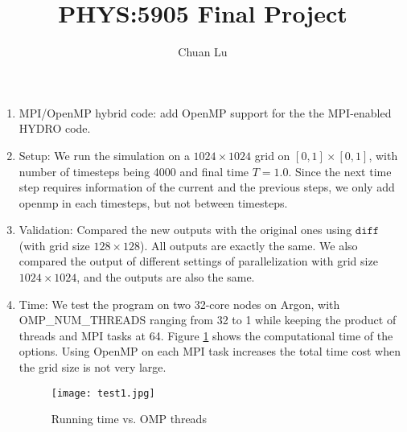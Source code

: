 \documentclass{article}
\begin{document}
\author{Chuan Lu}
\title{PHYS:5905 Final Project}
\maketitle

\medskip

\begin{enumerate}
\item MPI/OpenMP hybrid code: add OpenMP support for the the MPI-enabled HYDRO code.

\item Setup:
We run the simulation on a $1024\times 1024$ grid on $[0, 1]\times [0, 1]$, with number of timesteps being 4000 and final time $T = 1.0$. Since the next time step requires information of the current and the previous steps, we only add openmp in each timesteps, but not between timesteps.

\item Validation:
Compared the new outputs with the original ones using $\texttt{diff}$ (with grid size $128\times 128$). All outputs are exactly the same. We also compared the output of different settings of parallelization with grid size $1024\times 1024$, and the outputs are also the same.

\item Time: We test the program on two 32-core nodes on Argon, with OMP\_NUM\_THREADS ranging from 32 to 1 while keeping the product of threads and MPI tasks at 64. Figure \ref{1} shows the computational time of the options. Using OpenMP on each MPI task increases the total time cost when the grid size is not very large. 

\begin{figure}[h]
\centering
\texttt{[image: test1.jpg]}
\caption{Running time vs. OMP threads}
\label{1}
\end{figure}

\end{enumerate}
\end{document}

